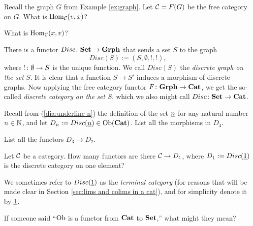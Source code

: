 \begin{exercise}
Recall the graph $G$ from Example \ref{ex:graph}. Let $\mathcal{C}=F(G)$ be the free category on $G$.
\sexc What is $\textnormal{Hom}_\mathcal{C}(v,x)$?
\item What is $\textnormal{Hom}_\mathcal{C}(x,v)$?
\endsexc
\end{exercise}

\begin{example}\label{ex:discrete graph discrete cat}

There is a functor $Disc\colon{\bf Set}\rightarrow{\bf Grph}$ that sends a set $S$ to the graph $$Disc(S):=(S,\emptyset,!,!),$$ where $!\colon\emptyset\rightarrow S$ is the unique function. We call $Disc(S)$ the {\em discrete graph on the set $S$}. It is clear that a function $S\to S'$ induces a morphism of discrete graphs. Now applying the free category functor $F\colon{\bf Grph}\rightarrow{\bf Cat}$, we get the so-called {\em discrete category on the set $S$}, which we also might call $Disc\colon{\bf Set}\rightarrow{\bf Cat}$. 

\end{example}

\begin{exercise}
Recall from (\ref{dia:underline n}) the definition of the set $\underline{n}$ for any natural number $n\in{\mathbb N}$, and let $D_n:=Disc(\underline{n})\in\textnormal{Ob}({\bf Cat})$.
\sexc List all the morphisms in $D_4$. 
\item List all the functors $D_3\to D_2.$
\endsexc
\end{exercise}

\begin{exercise}\label{exc:term cat}
Let $\mathcal{C}$ be a category. How many functors are there $\mathcal{C}\rightarrow D_1$, where $D_1:=Disc(\underline{1})$ is the discrete category on one element?
\end{exercise}

We sometimes refer to $Disc(\underline{1})$ as the {\em terminal category} (for reasons that will be made clear in Section \ref{sec:lims and colims in a cat}), and for simplicity denote it by $\underline{1}$.

\begin{exercise}\label{exc:Ob is a functor}
If someone said “$\textnormal{Ob}$ is a functor from ${\bf Cat}$ to ${\bf Set}$,” what might they mean? 
\end{exercise}

